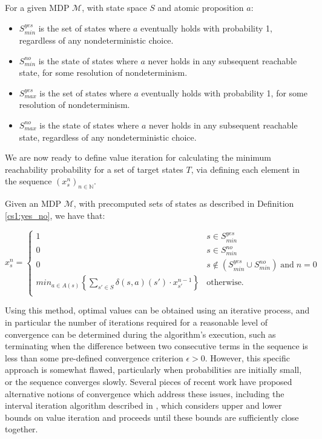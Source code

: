 \begin{definition}
\label{cs1:yes_no}

For a given MDP $\mathcal{M}$, with state space $S$ and atomic proposition $a$:

\begin{itemize}
    \item $S^{yes}_{min}$ is the set of states where $a$ eventually holds with probability 1, regardless of any nondeterministic choice.
    \item $S^{no}_{min}$ is the state of states where $a$ never holds in any subsequent reachable state, for some resolution of nondeterminism.
    \item $S^{yes}_{max}$ is the set of states where $a$ eventually holds with probability 1, for some resolution of nondeterminism.
    \item $S^{no}_{max}$ is the state of states where $a$ never holds in any subsequent reachable state, regardless of any nondeterministic choice.  
\end{itemize}
\end{definition}

We are now ready to define value iteration for calculating the minimum reachability probability for a set of target states $T$, via defining each element in the sequence $(x^n_s)_{n \in \mathbb{N}}$.

\begin{definition}
\label{cs1:value_iteration}

Given an MDP $\mathcal{M}$, with precomputed sets of states as described in Definition \ref{cs1:yes_no}, we have that:

\begin{equation*}
x^n_s = \begin{cases}
        1 & s \in S^{yes}_{min} \\
        0 & s \in S^{no}_{min} \\
        0 & s \notin (S^{yes}_{min} \cup S^{no}_{min}) \; \text{and} \; n=0 \\
        min_{a \in A(s)} \left\{ \sum_{s' \in S}\delta(s,a)(s') \cdot x^{n-1}_{s'} \right\} & \text{otherwise.} \\
    \end{cases}
\end{equation*}

\end{definition}

Using this method, optimal values can be obtained using an iterative process, and in particular the number of iterations required for a reasonable level of convergence can be determined during the algorithm's execution, such as terminating when the difference between two consecutive terms in the sequence is less than some pre-defined convergence criterion $\epsilon>0$. However, this specific approach is somewhat flawed, particularly when probabilities are initially small, or the sequence converges slowly. Several pieces of recent work have proposed alternative notions of convergence which address these issues, including the interval iteration algorithm described in \cite{haddad_interval_2018}, which considers upper and lower bounds on value iteration and proceeds until these bounds are sufficiently close together.

